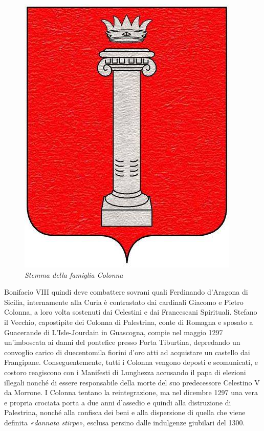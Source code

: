\documentclass[
  letterpaper,
  DIV=11,
  numbers=noendperiod]{scrartcl}
\begin{document}
\begin{figure}

{\centering \includegraphics{../../images/2024/san_rocco/3Stemma_Colonna.jpg}

}

\caption{\emph{Stemma della famiglia Colonna}}

\end{figure}

Bonifacio VIII quindi deve combattere sovrani quali Ferdinando d'Aragona
di Sicilia, internamente alla Curia è contrastato dai cardinali Giacomo
e Pietro Colonna, a loro volta sostenuti dai Celestini e dai Francescani
Spirituali. Stefano il Vecchio, capostipite dei Colonna di Palestrina,
conte di Romagna e sposato a Guacerande di L'Isle-Jourdain in Guascogna,
compie nel maggio 1297 un'imboscata ai danni del pontefice presso Porta
Tiburtina, depredando un convoglio carico di duecentomila fiorini d'oro
atti ad acquistare un castello dai Frangipane. Conseguentemente, tutti i
Colonna vengono deposti e scomunicati, e costoro reagiscono con i
Manifesti di Lunghezza accusando il papa di elezioni illegali nonché di
essere responsabile della morte del suo predecessore Celestino V da
Morrone. I Colonna tentano la reintegrazione, ma nel dicembre 1297 una
vera e propria crociata porta a due anni d'assedio e quindi alla
distruzione di Palestrina, nonché alla confisca dei beni e alla
dispersione di quella che viene definita \emph{«dannata stirpe»},
esclusa persino dalle indulgenze giubilari del 1300.
\end{document}
